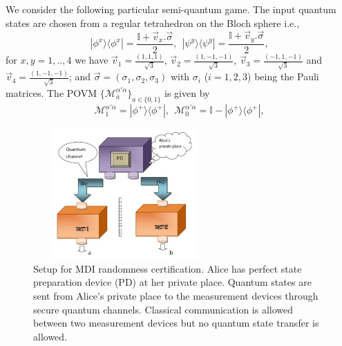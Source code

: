 \documentclass[doublecol,linenumbers]{epl2} %
\begin{document}
We consider the following particular semi-quantum game. The input quantum states are chosen from a regular tetrahedron on the Bloch sphere i.e., 
\begin{equation}\label{qstate}
|\phi^x\rangle\langle\phi^x|=\frac{\mathbb{I}+\vec{v}_x.\vec{\sigma}}{2},
~~|\psi^y\rangle\langle\psi^y|=\frac{\mathbb{I}+\vec{v}_y.\vec{\sigma}}{2},
\end{equation}     
for $x,y=1,..,4$ we have $\vec{v}_1=\frac{(1,1,1)}{\sqrt{3}}$, $\vec{v}_2=\frac{(1,-1,-1)}{\sqrt{3}}$, $\vec{v}_3=\frac{(-1,1,-1)}{\sqrt{3}}$ and $\vec{v}_4=\frac{(1,-1,-1)}{\sqrt{3}}$; and $\vec{\sigma}=(\sigma_1,\sigma_2,\sigma_3)$ with $\sigma_i$ ($i=1,2,3$) being the Pauli matrices. The POVM $\{\mathcal{M}^{\alpha'\alpha}_a\}_{a\in \{0,1\}}$ is given by 
\begin{equation}
\mathcal{M}^{\alpha'\alpha}_1=|\phi^+\rangle\langle\phi^+|,~~\mathcal{M}^{\alpha'\alpha}_0=\mathbb{I}-|\phi^+\rangle\langle\phi^+|,
\end{equation}
\begin{figure}[t]
\centering
\includegraphics[height=5cm,width=7cm]{fig2.pdf}
\caption{Setup for MDI randomness certification. Alice has perfect state preparation device (PD) at her private place. Quantum states are sent from Alice's private place to the measurement devices through secure quantum channels. Classical communication is allowed between two measurement devices but no quantum state transfer is allowed.}\label{fig2}
\end{figure}
\end{document}
